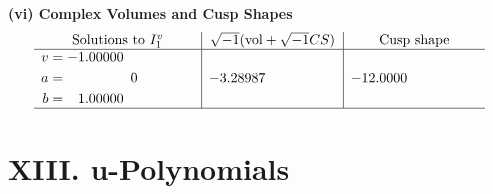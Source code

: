 \documentclass[1p]{elsarticle_modified}
\theoremstyle{definition}
\newcommand{\I}{\sqrt{-1}}
\begin{document}
\newpage\flushleft \textbf{(vi) Complex Volumes and Cusp Shapes}
$$\begin{array}{c|c|c}  
\text{Solutions to }I^v_{1}& \I (\text{vol} + \sqrt{-1}CS) & \text{Cusp shape}\\
 \hline 
\begin{aligned}
v &= -1.00000\phantom{ +0.000000I} \\
a &= \phantom{-0.000000 } 0 \\
b &= \phantom{-}1.00000\phantom{ +0.000000I}\end{aligned}
 & -3.28987\phantom{ +0.000000I} & -12.0000\phantom{ +0.000000I}\\
 \hline 
 \end{array}$$\newpage
\newpage\renewcommand{\arraystretch}{1}
\centering \section*{ XIII. u-Polynomials}
\end{document}
